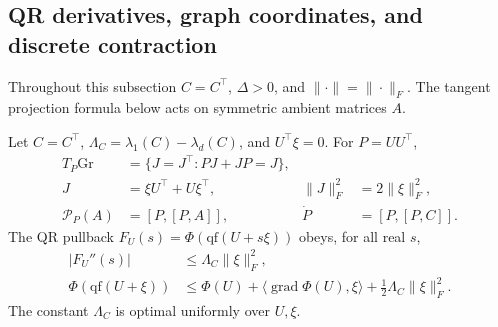 \subsection{QR derivatives, graph coordinates, and discrete contraction}
\label{app:formal-geometry}
Throughout this subsection $C=C^\top$, $\Delta>0$, and $\|\cdot\|=\|\cdot\|_F$.
The tangent projection formula below acts on symmetric ambient matrices $A$.

\begin{proposition}
\label{prop:qr-calculus}
Let $C=C^\top$, $\Lambda_C=\lambda_1(C)-\lambda_d(C)$, and $U^\top\xi=0$.
For $P=UU^\top$,
\begin{align}
 T_P\mathrm{Gr}&=\{J=J^\top:PJ+JP=J\},\\
 J&=\xi U^\top+U\xi^\top,&\|J\|_F^2&=2\|\xi\|_F^2,\\
 \mathcal P_P(A)&=[P,[P,A]],&\dot P&=[P,[P,C]].
 \label{eq:double-bracket}
\end{align}
The QR pullback $F_U(s)=\Phi(\mathrm{qf}(U+s\xi))$ obeys, for all real $s$,
\begin{align}
 |F_U''(s)|&\le\Lambda_C\|\xi\|_F^2,\\
 \Phi(\mathrm{qf}(U+\xi))
 &\le\Phi(U)+\langle\operatorname{grad}\Phi(U),\xi\rangle
                                  +\tfrac12\Lambda_C\|\xi\|_F^2.
 \label{eq:explicit-pullback}
\end{align}
The constant $\Lambda_C$ is optimal uniformly over $U,\xi$.
\end{proposition}
